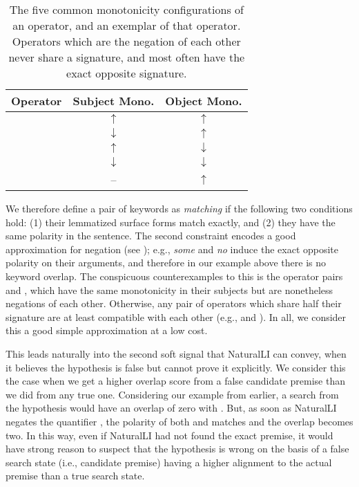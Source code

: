 \begin{table}
\begin{center}
\begin{tabular}{lcc}
  \hline
  \textbf{Operator} & \textbf{Subject Mono.} & \textbf{Object Mono.} \\
  \hline
  \w{Some}    & $\uparrow$   & $\uparrow$ \\
  \w{All}     & $\downarrow$ & $\uparrow$ \\
  \w{Not all} & $\uparrow$   & $\downarrow$ \\
  \w{No}      & $\downarrow$ & $\downarrow$ \\
  \w{Most}    & --           & $\uparrow$ \\
  \hline
\end{tabular}
\end{center}
\caption{\label{tab:operatormono}
  The five common monotonicity configurations of an operator, and an exemplar
    of that operator.
  Operators which are the negation of each other never share a signature, and
    most often have the exact opposite signature.
}
\end{table}

We therefore define a pair of keywords as \textit{matching} if the following two
  conditions hold: 
  (1) their lemmatized surface forms match exactly, and 
  (2) they have the same polarity in the sentence.
The second constraint encodes a good approximation for negation (see );
  e.g., \textit{some}
  and \textit{no} induce the exact opposite polarity on their arguments,
  and therefore in our example above there is no keyword overlap.
The conspicuous counterexamples to this is the operator pairs  and ,
  which have the same monotonicity in their subjects but are nonetheless negations
  of each other.
Otherwise, any pair of operators which share half their signature are at least
  compatible with each other (e.g.,  and ).
In all, we consider this a good simple approximation at a low cost.

This leads naturally into the second soft signal that NaturalLI can convey, when
  it believes the hypothesis is false but cannot prove it explicitly.
We consider this the case when we get a higher overlap score from a false
  candidate premise than we did from any true one.
Considering our example from earlier, a search from the hypothesis
   would have an overlap of zero with .
But, as soon as NaturalLI negates the quantifier , the polarity of both
   and  matches and the overlap becomes two.
In this way, even if NaturalLI had not found the exact premise, it would have
  strong reason to suspect that the hypothesis is wrong on the basis of a
  false search state (i.e., candidate premise) having a higher alignment to 
  the actual premise than a true search state.

